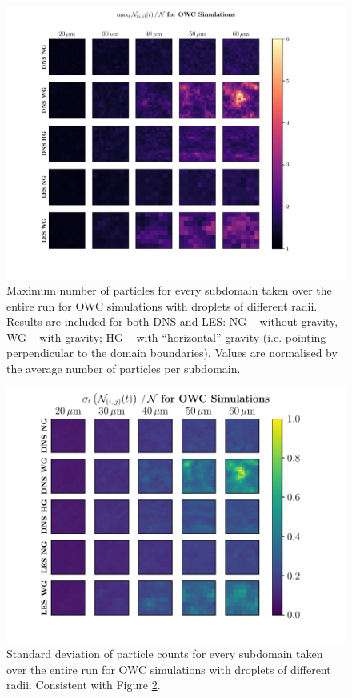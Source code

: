 \begin{figure}
\centering
\includegraphics[width=17cm]{figures/3-18_pfpgridowcmax.pdf}
\caption{
Maximum number of particles for every subdomain taken over the entire run for OWC simulations with droplets of different radii.
Results are included for both DNS and LES: NG -- without gravity, WG -- with gravity; HG -- with ``horizontal'' gravity (i.e. pointing perpendicular to the domain boundaries).
Values are normalised by the average number of particles per subdomain.
}
\label{fig:pfpgridowcmax}
\end{figure}    


\begin{figure}
\centering
\includegraphics[width=13.5cm]{figures/3-19_pfpgridowcstd.pdf}
\caption{
Standard deviation of particle counts for every subdomain taken over the entire run for OWC simulations with droplets of different radii.
Consistent with Figure \ref{fig:pfpgridowcstd}.
}
\label{fig:pfpgridowcstd}
\end{figure}    

